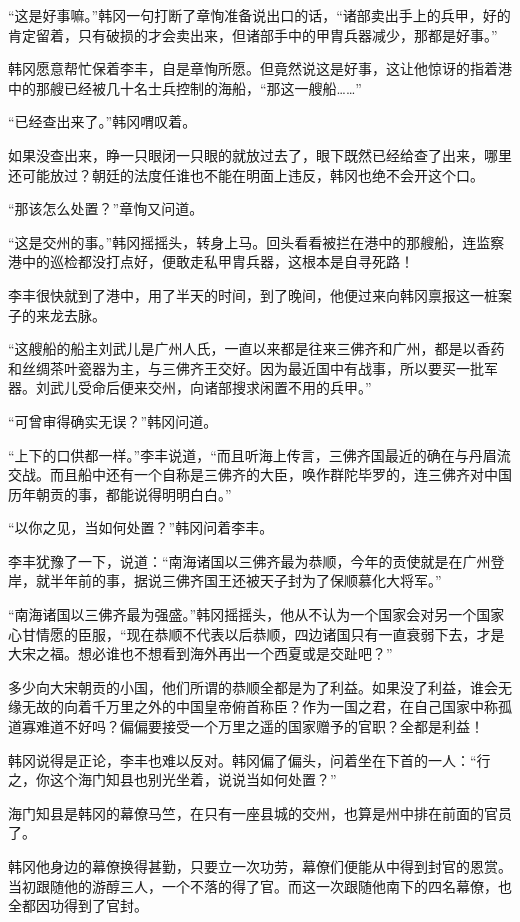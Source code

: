 “这是好事嘛。”韩冈一句打断了章恂准备说出口的话，“诸部卖出手上的兵甲，好的肯定留着，只有破损的才会卖出来，但诸部手中的甲胄兵器减少，那都是好事。”

韩冈愿意帮忙保着李丰，自是章恂所愿。但竟然说这是好事，这让他惊讶的指着港中的那艘已经被几十名士兵控制的海船，“那这一艘船……”

“已经查出来了。”韩冈喟叹着。

如果没查出来，睁一只眼闭一只眼的就放过去了，眼下既然已经给查了出来，哪里还可能放过？朝廷的法度任谁也不能在明面上违反，韩冈也绝不会开这个口。

“那该怎么处置？”章恂又问道。

“这是交州的事。”韩冈摇摇头，转身上马。回头看看被拦在港中的那艘船，连监察港中的巡检都没打点好，便敢走私甲胄兵器，这根本是自寻死路！

李丰很快就到了港中，用了半天的时间，到了晚间，他便过来向韩冈禀报这一桩案子的来龙去脉。

“这艘船的船主刘武儿是广州人氏，一直以来都是往来三佛齐和广州，都是以香药和丝绸茶叶瓷器为主，与三佛齐王交好。因为最近国中有战事，所以要买一批军器。刘武儿受命后便来交州，向诸部搜求闲置不用的兵甲。”

“可曾审得确实无误？”韩冈问道。

“上下的口供都一样。”李丰说道，“而且听海上传言，三佛齐国最近的确在与丹眉流交战。而且船中还有一个自称是三佛齐的大臣，唤作群陀毕罗的，连三佛齐对中国历年朝贡的事，都能说得明明白白。”

“以你之见，当如何处置？”韩冈问着李丰。

李丰犹豫了一下，说道：“南海诸国以三佛齐最为恭顺，今年的贡使就是在广州登岸，就半年前的事，据说三佛齐国王还被天子封为了保顺慕化大将军。”

“南海诸国以三佛齐最为强盛。”韩冈摇摇头，他从不认为一个国家会对另一个国家心甘情愿的臣服，“现在恭顺不代表以后恭顺，四边诸国只有一直衰弱下去，才是大宋之福。想必谁也不想看到海外再出一个西夏或是交趾吧？”

多少向大宋朝贡的小国，他们所谓的恭顺全都是为了利益。如果没了利益，谁会无缘无故的向着千万里之外的中国皇帝俯首称臣？作为一国之君，在自己国家中称孤道寡难道不好吗？偏偏要接受一个万里之遥的国家赠予的官职？全都是利益！

韩冈说得是正论，李丰也难以反对。韩冈偏了偏头，问着坐在下首的一人：“行之，你这个海门知县也别光坐着，说说当如何处置？”

海门知县是韩冈的幕僚马竺，在只有一座县城的交州，也算是州中排在前面的官员了。

韩冈他身边的幕僚换得甚勤，只要立一次功劳，幕僚们便能从中得到封官的恩赏。当初跟随他的游醇三人，一个不落的得了官。而这一次跟随他南下的四名幕僚，也全都因功得到了官封。

